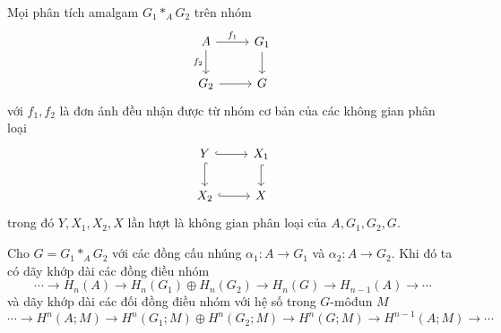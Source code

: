 \begin{theorem}
    Mọi phân tích amalgam $G_1 *_A G_2$ trên nhóm
    $$
        \begin{tikzcd}
            A \arrow[d, "f_2"'] \arrow[r, "f_1"] & G_1 \arrow[d] \\
            G_2 \arrow[r]                        & G
        \end{tikzcd}
    $$
    với $f_1, f_2$ là đơn ánh đều nhận được từ nhóm cơ bản của các không gian phân loại
    $$
        \begin{tikzcd}
            Y \arrow[r, hook] \arrow[d, hook] & X_1 \arrow[d, hook] \\
            X_2 \arrow[r, hook]               & X
        \end{tikzcd}
    $$
    trong đó $Y,X_1,X_2,X$ lần lượt là không gian phân loại của $A,G_1,G_2,G$.
\end{theorem}

\begin{proposition}\label{prop:long-seq-amalgam}
    Cho $G = G_1 *_A G_2$ với các đồng cấu nhúng $\alpha_1: A \rightarrow G_1$ và $\alpha_2: A \rightarrow G_2$. Khi đó ta có dãy khớp dài các đồng điều nhóm
    $$
        \cdots \xrightarrow{} H_n(A) \xrightarrow{} H_n(G_1) \oplus H_n(G_2) \xrightarrow{} H_n(G) \xrightarrow{} H_{n-1}(A) \xrightarrow{} \cdots
    $$
    và dãy khớp dài các đối đồng điều nhóm với hệ số trong $G$-môđun $M$
    $$
        \cdots \xrightarrow{} H^n(A;M) \xrightarrow{} H^n(G_1;M) \oplus H^n(G_2;M) \xrightarrow{} H^n(G;M) \xrightarrow{} H^{n-1}(A;M) \xrightarrow{} \cdots
    $$
\end{proposition}
